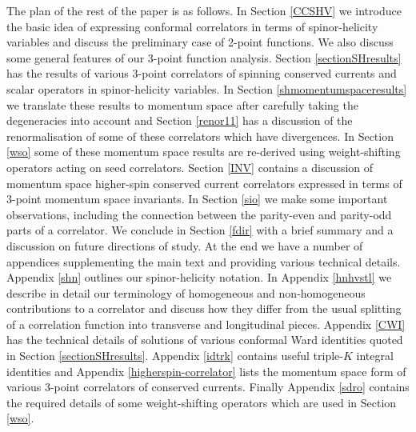 \documentclass[a4paper,11pt]{article}
\begin{document}
The plan of the rest of the paper is as follows. In Section \ref{CCSHV} we introduce the basic idea of expressing conformal correlators in terms of spinor-helicity variables and discuss the preliminary case of 2-point functions. We also discuss some general features of our 3-point function analysis. Section \ref{sectionSHresults} has the results of various 3-point correlators of spinning conserved currents and scalar operators in spinor-helicity variables. In Section \ref{shmomentumspaceresults} we translate these results to momentum space after carefully taking the degeneracies into account and Section \ref{renor11} has a discussion of the renormalisation of some of these correlators which have divergences. In Section \ref{wso} some of these momentum space results are re-derived using weight-shifting operators acting on seed correlators. Section \ref{INV} contains a discussion of momentum space higher-spin conserved current correlators expressed in terms of 3-point momentum space invariants. In Section \ref{sio} we make some important observations, including the connection between the parity-even and parity-odd parts of a correlator. We conclude in Section \ref{fdir} with a brief summary and a discussion on future directions of study. At the end we have a number of appendices supplementing the main text and providing various technical details. Appendix \ref{shn} outlines our spinor-helicity notation.  In Appendix \ref{hnhvstl} we describe in detail our terminology of homogeneous and non-homogeneous contributions to a correlator and discuss how they differ from the usual splitting of a correlation function into transverse and longitudinal pieces. Appendix \ref{CWI} has the technical details of solutions of various conformal Ward identities quoted in Section \ref{sectionSHresults}. Appendix \ref{idtrk} contains useful triple-$K$ integral identities and Appendix \ref{higherspin-correlator} lists the momentum space form of various 3-point correlators of conserved currents. Finally Appendix \ref{sdro} contains the required details of some weight-shifting operators which are used in Section \ref{wso}.

\end{document}
